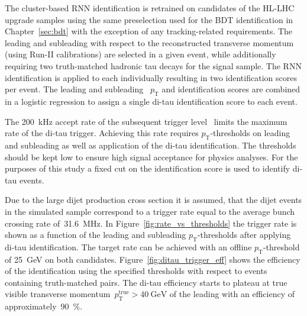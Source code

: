 The cluster-based RNN identification is retrained on \tauhadvis candidates of
the HL-LHC upgrade samples using the same preselection used for the BDT
identification in Chapter~\ref{sec:bdt} with the exception of any
tracking-related requirements. The leading and subleading \tauhadvis with
respect to the reconstructed transverse momentum (using Run-II calibrations) are
selected in a given event, while additionally requiring two truth-matched
hadronic tau decays for the signal sample. The RNN identification is applied to
each \tauhadvis individually resulting in two identification scores per event.
The leading and subleading \tauhadvis~$p_\text{T}$ and identification scores are
combined in a logistic regression to assign a single di-tau identification score
to each event.

The \SI{200}{\kilo\hertz} accept rate of the subsequent trigger
level~\cite{phase_2_scoping} limits the maximum rate of the di-tau trigger.
Achieving this rate requires $p_\text{T}$-thresholds on leading and subleading
\tauhadvis as well as application of the di-tau identification. The thresholds
should be kept low to ensure high signal acceptance for physics analyses. For
the purposes of this study a fixed cut on the identification score  is used to identify di-tau events.

Due to the large dijet production cross section it is assumed, that the dijet
events in the simulated sample correspond to a trigger rate equal to the average
bunch crossing rate of~\SI{31.6}{\mega\hertz}. In
Figure~\ref{fig:rate_vs_thresholds} the trigger rate is shown as a function of
the leading and subleading \tauhadvis $p_\text{T}$-thresholds after applying
di-tau identification. The target rate can be achieved with an offline
$p_\text{T}$-threshold of \SI{25}{\GeV} on both \tauhadvis candidates.
Figure~\ref{fig:ditau_trigger_eff} shows the efficiency of the identification
using the specified thresholds with respect to events containing truth-matched
\tauhadvis pairs. The di-tau efficiency starts to plateau at true visible
transverse momentum~$p_\text{T}^\text{true} > \SI{40}{\GeV}$ of the leading
\tauhadvis with an efficiency of approximately~\SI{90}{\percent}.

